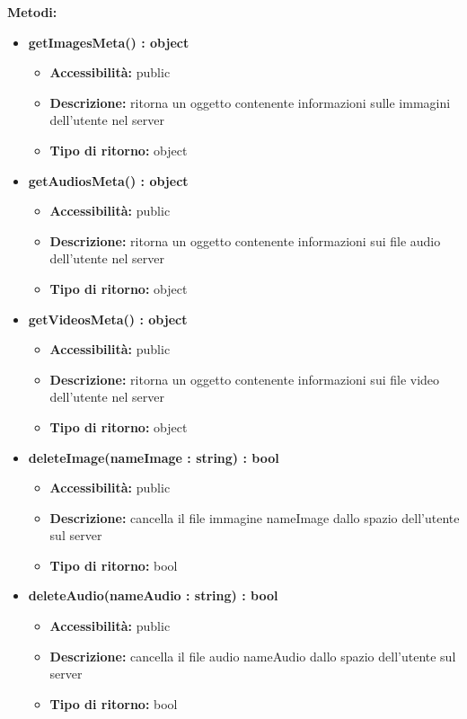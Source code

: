 {{		\textbf{Metodi:}
			\begin{itemize}
			\item \textbf{getImagesMeta() : object}
				\begin{itemize}
				\item \textbf{Accessibilit\`{a}:} public
				\item \textbf{Descrizione:} ritorna un oggetto contenente informazioni sulle immagini dell'utente nel server
				\item \textbf{Tipo di ritorno:} object
				\end{itemize}
			\item \textbf{getAudiosMeta() : object}
				\begin{itemize}
				\item \textbf{Accessibilit\`{a}:} public
				\item \textbf{Descrizione:} ritorna un oggetto contenente informazioni sui file audio dell'utente nel server
				\item \textbf{Tipo di ritorno:} object
				\end{itemize}
			\item \textbf{getVideosMeta() : object}
				\begin{itemize}
				\item \textbf{Accessibilit\`{a}:} public
				\item \textbf{Descrizione:} ritorna un oggetto contenente informazioni sui file video dell'utente nel server
				\item \textbf{Tipo di ritorno:} object
				\end{itemize}
			\item \textbf{deleteImage(nameImage : string) : bool}
				\begin{itemize}
				\item \textbf{Accessibilit\`{a}:} public
				\item \textbf{Descrizione:} cancella il file immagine nameImage dallo spazio dell'utente sul server
				\item \textbf{Tipo di ritorno:} bool
				\end{itemize}
			\item \textbf{deleteAudio(nameAudio : string) : bool}
				\begin{itemize}
				\item \textbf{Accessibilit\`{a}:} public
				\item \textbf{Descrizione:} cancella il file audio nameAudio dallo spazio dell'utente sul server
				\item \textbf{Tipo di ritorno:} bool

\end{itemize}
\end{itemize}}}
